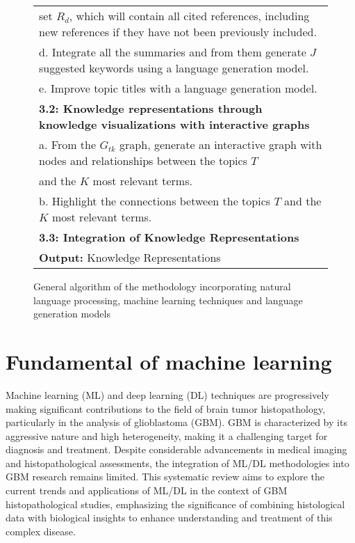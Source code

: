 \documentclass[runningheads]{llncs}
\begin{document}
\begin{figure*}[!h]
{\begin{tabular}{l}
			\quad \quad \quad set $R_d$, which will contain all cited references, including new references if they have not been previously included.\\
			\quad \quad d. Integrate all the summaries and from them generate $J$ suggested keywords using a language generation model.\\
			\quad \quad e. Improve topic titles with a language generation model.\\
			\quad \textbf{3.2: Knowledge representations through knowledge visualizations with interactive graphs}\\
			\quad \quad a. From the $G_{tk}$ graph, generate an interactive graph with nodes and relationships between the topics $T$\\
			\quad \quad and the $K$ most relevant terms.\\
			\quad \quad b. Highlight the connections between the topics $T$ and the $K$ most relevant terms.\\
			\quad \textbf{3.3: Integration of Knowledge Representations}\\
			\hline
			\textbf{Output:} Knowledge Representations \\
			\hline
		\end{tabular}
	}
	\caption{\centering General algorithm of the methodology incorporating natural language processing, machine learning techniques and language generation models}
	\label{tab:Algorithm}
\end{figure*}

\FloatBarrier


\section{Fundamental of machine learning}
Machine learning (ML) and deep learning (DL) techniques are progressively making significant contributions to the field of brain tumor histopathology, particularly in the analysis of glioblastoma (GBM). GBM is characterized by its aggressive nature and high heterogeneity, making it a challenging target for diagnosis and treatment. Despite considerable advancements in medical imaging and histopathological assessments, the integration of ML/DL methodologies into GBM research remains limited. This systematic review aims to explore the current trends and applications of ML/DL in the context of GBM histopathological studies, emphasizing the significance of combining histological data with biological insights to enhance understanding and treatment of this complex disease.
\end{document}
